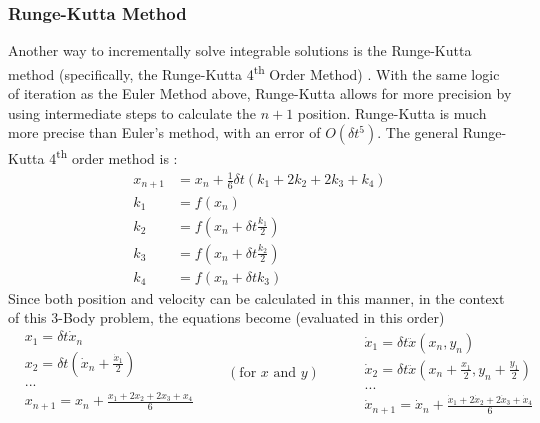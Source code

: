 \documentclass[preprint,titlepage,preprintnumbers,amsmath,amssymb,aps,11pt]{revtex4-2}
\begin{document}
\subsubsection{Runge-Kutta Method}\label{sec:rungekutta}
Another way to incrementally solve integrable solutions is the Runge-Kutta method (specifically, the Runge-Kutta 4\textsuperscript{th} Order Method) \cite{Musielak_2014}. With the same logic of iteration as the Euler Method above, Runge-Kutta allows for more precision by using intermediate steps to calculate the $n+1$ position. Runge-Kutta is much more precise than Euler's method, with an error of $O(\delta t^5)$. The general Runge-Kutta 4\textsuperscript{th} order method is \cite[p. 21]{Musielak_2014}:
\begin{equation}
    \begin{aligned}
        x_{n+1} & =x_n+\frac{1}{6}\delta t(k_1+2k_2+2k_3+k_4) \\
        k_1     & =f(x_n)                                     \\
        k_2     & =f(x_n+\delta t\frac{k_1}{2})               \\
        k_3     & =f(x_n+\delta t\frac{k_2}{2})               \\
        k_4     & =f(x_n+\delta tk_3)
    \end{aligned}
    \label{eq:rungekutta}
\end{equation}
Since both position and velocity can be calculated in this manner, in the context of this 3-Body problem, the equations become (evaluated in this order)
\begin{equation}
    \begin{split}
        &x_1=\delta t\dot{x}_n \\
        &x_2=\delta t(\dot{x}_n+\frac{\dot{x}_1}{2}) \\
        &... \\
        &x_{n+1}=x_n+\frac{x_1+2x_2+2x_3+x_4}{6} \\
    \end{split}
    \qquad(\text{for }x\text{ and } y)\qquad
    \begin{split}
        &\dot{x}_1=\delta t\ddot{x}(x_n,y_n) \\
        &\dot{x}_2=\delta t\ddot{x}(x_n+\frac{x_1}{2},y_n+\frac{y_1}{2}) \\
        &... \\
        &\dot{x}_{n+1}=\dot{x}_n+\frac{\dot{x}_1+2\dot{x}_2+2\dot{x}_3+\dot{x}_4}{6}
    \end{split}
    \label{eq:rungekutta-3bp}
\end{equation}
\end{document}
